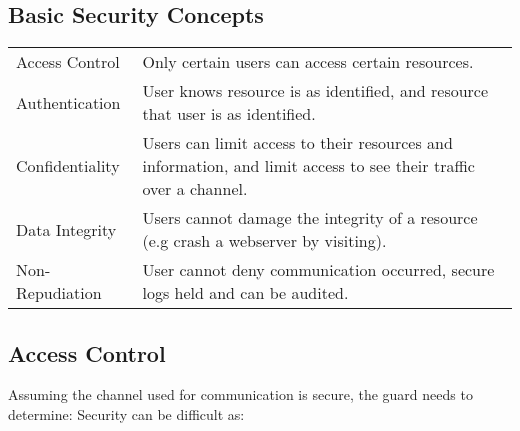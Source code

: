 \documentclass{report}
\begin{document}
        \subsection*{Basic Security Concepts}
            \begin{center}
                \begin{tabular}{l p{}}
                    Access Control & Only certain users can access certain resources. \\
                    Authentication & User knows resource is as identified, and resource that user is as identified. \\
                    Confidentiality & Users can limit access to their resources and information, and limit access to see their traffic over a channel. \\
                    Data Integrity & Users cannot damage the integrity of a resource (e.g crash a webserver by visiting). \\
                    Non-Repudiation & User cannot deny communication occurred, secure logs held and can be audited. \\
                \end{tabular}
            \end{center}
        
        \subsection*{Access Control}    
            Assuming the channel used for communication is secure, the guard needs to determine:
            Security can be difficult as:
\end{document}
